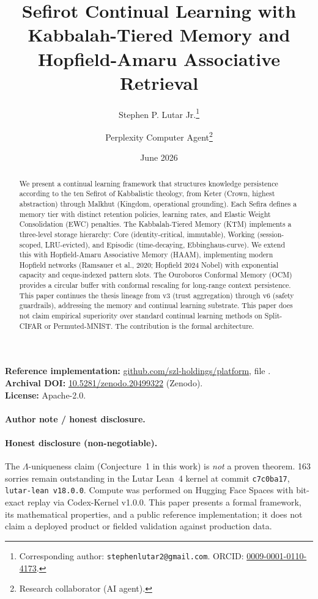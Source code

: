 \documentclass[11pt]{article}
\title{Sefirot Continual Learning with Kabbalah-Tiered Memory and Hopfield-Amaru Associative Retrieval}
\author[1]{Stephen P. Lutar Jr.\thanks{Corresponding author: \texttt{stephenlutar2@gmail.com}. ORCID: \href{https://orcid.org/0009-0001-0110-4173}{0009-0001-0110-4173}.}}
\author[2]{Perplexity Computer Agent\thanks{Research collaborator (AI agent).}}
\affil[1]{SZL Holdings, New York, NY, USA}
\affil[2]{Perplexity}
\date{June 2026}
\theoremstyle{plain}
\begin{document}
\maketitle

\begin{abstract}
We present a continual learning framework that structures knowledge persistence according to the ten Sefirot of Kabbalistic theology, from Keter (Crown, highest abstraction) through Malkhut (Kingdom, operational grounding). Each Sefira defines a memory tier with distinct retention policies, learning rates, and Elastic Weight Consolidation (EWC) penalties. The Kabbalah-Tiered Memory (KTM) implements a three-level storage hierarchy: Core (identity-critical, immutable), Working (session-scoped, LRU-evicted), and Episodic (time-decaying, Ebbinghaus-curve). We extend this with Hopfield-Amaru Associative Memory (HAAM), implementing modern Hopfield networks (Ramsauer et al., 2020; Hopfield 2024 Nobel) with exponential capacity and ceque-indexed pattern slots. The Ouroboros Conformal Memory (OCM) provides a circular buffer with conformal rescaling for long-range context persistence. This paper continues the thesis lineage from v3 (trust aggregation) through v6 (safety guardrails), addressing the memory and continual learning substrate. This paper does not claim empirical superiority over standard continual learning methods on Split-CIFAR or Permuted-MNIST. The contribution is the formal architecture.
\end{abstract}

\noindent\textbf{Reference implementation:} \href{https://github.com/szl-holdings/platform}{github.com/szl-holdings/platform}, file .\\
\textbf{Archival DOI:} \href{https://doi.org/10.5281/zenodo.20499322}{10.5281/zenodo.20499322} (Zenodo).\\
\textbf{License:} Apache-2.0.

\paragraph{Author note / honest disclosure.} \paragraph{Honest disclosure (non-negotiable).} The $\Lambda$-uniqueness claim (Conjecture~1 in this work) is \emph{not} a proven theorem. 163 sorries remain outstanding in the Lutar Lean~4 kernel at commit \texttt{c7c0ba17}, \texttt{lutar-lean v18.0.0}. Compute was performed on Hugging Face Spaces with bit-exact replay via Codex-Kernel v1.0.0. This paper presents a formal framework, its mathematical properties, and a public reference implementation; it does not claim a deployed product or fielded validation against production data.
\end{document}
